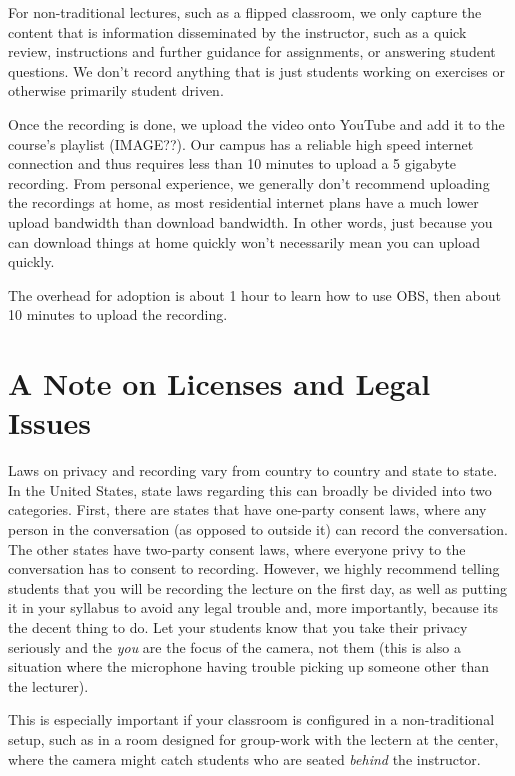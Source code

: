 \documentclass[sigconf]{acmart}
\begin{document}
For non-traditional lectures, such as a flipped classroom, we only capture the content that is information disseminated by the instructor, such as a quick review, instructions and further guidance for assignments, or answering student questions.
We don't record anything that is just students working on exercises or otherwise primarily student driven.

Once the recording is done, we upload the video onto YouTube and add it to the course's playlist (IMAGE??).
Our campus has a reliable high speed internet connection and thus requires less than 10 minutes to upload a 5 gigabyte recording.
From personal experience, we generally don't recommend uploading the recordings at home, as most residential internet plans have a much lower upload bandwidth than download bandwidth.
In other words, just because you can download things at home quickly won't necessarily mean you can upload quickly.

The overhead for adoption is about 1 hour to learn how to use OBS, then about 10 minutes to upload the recording.






\section{A Note on Licenses and Legal Issues}



Laws on privacy and recording vary from country to country and state to state.
In the United States, state laws regarding this can broadly be divided into two categories.
First, there are states that have one-party consent laws, where any person in the conversation (as opposed to outside it) can record the conversation.
The other states have two-party consent laws, where everyone privy to the conversation has to consent to recording.
However, we highly recommend telling students that you will be recording the lecture on the first day, as well as putting it in your syllabus to avoid any legal trouble and, more importantly, because its the decent thing to do.
Let your students know that you take their privacy seriously and the \textit{you} are the focus of the camera, not them (this is also a situation where the microphone having trouble picking up someone other than the lecturer).

This is especially important if your classroom is configured in a non-traditional setup, such as in a room designed for group-work with the lectern at the center, where the camera might catch students who are seated \textit{behind} the instructor.





\end{document}
